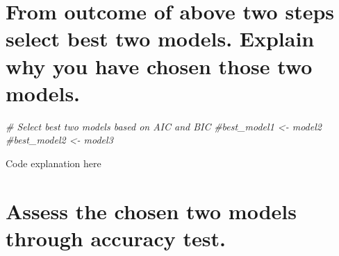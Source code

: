 \documentclass[
]{book}
\newenvironment{Shaded}{\begin{snugshade}}{\end{snugshade}}
\newcommand{\CommentTok}[1]{\textcolor[rgb]{0.56,0.35,0.01}{\textit{#1}}}
\begin{document}
\section{From outcome of above two steps select best two models. Explain why you have chosen those two models.}\label{from-outcome-of-above-two-steps-select-best-two-models.-explain-why-you-have-chosen-those-two-models.}

\begin{Shaded}
\begin{Highlighting}[]
\CommentTok{\# Select best two models based on AIC and BIC}
\CommentTok{\#best\_model1 \textless{}{-} model2}
\CommentTok{\#best\_model2 \textless{}{-} model3}
\end{Highlighting}
\end{Shaded}

Code explanation here

\section{Assess the chosen two models through accuracy test.}\label{assess-the-chosen-two-models-through-accuracy-test.}
\end{document}

